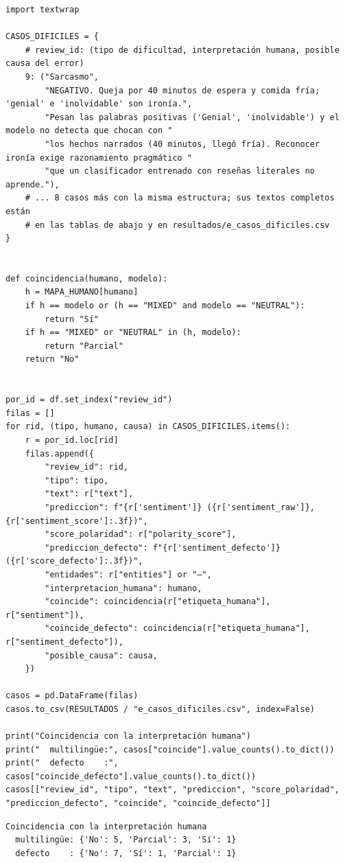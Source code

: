 \documentclass[12pt,a4paper]{article}
\begin{document}
\begin{lstlisting}[style=codigo]
import textwrap

CASOS_DIFICILES = {
    # review_id: (tipo de dificultad, interpretación humana, posible causa del error)
    9: ("Sarcasmo",
        "NEGATIVO. Queja por 40 minutos de espera y comida fría; 'genial' e 'inolvidable' son ironía.",
        "Pesan las palabras positivas ('Genial', 'inolvidable') y el modelo no detecta que chocan con "
        "los hechos narrados (40 minutos, llegó fría). Reconocer ironía exige razonamiento pragmático "
        "que un clasificador entrenado con reseñas literales no aprende."),
    # ... 8 casos más con la misma estructura; sus textos completos están
    # en las tablas de abajo y en resultados/e_casos_dificiles.csv
}


def coincidencia(humano, modelo):
    h = MAPA_HUMANO[humano]
    if h == modelo or (h == "MIXED" and modelo == "NEUTRAL"):
        return "Sí"
    if h == "MIXED" or "NEUTRAL" in (h, modelo):
        return "Parcial"
    return "No"


por_id = df.set_index("review_id")
filas = []
for rid, (tipo, humano, causa) in CASOS_DIFICILES.items():
    r = por_id.loc[rid]
    filas.append({
        "review_id": rid,
        "tipo": tipo,
        "text": r["text"],
        "prediccion": f"{r['sentiment']} ({r['sentiment_raw']}, {r['sentiment_score']:.3f})",
        "score_polaridad": r["polarity_score"],
        "prediccion_defecto": f"{r['sentiment_defecto']} ({r['score_defecto']:.3f})",
        "entidades": r["entities"] or "—",
        "interpretacion_humana": humano,
        "coincide": coincidencia(r["etiqueta_humana"], r["sentiment"]),
        "coincide_defecto": coincidencia(r["etiqueta_humana"], r["sentiment_defecto"]),
        "posible_causa": causa,
    })

casos = pd.DataFrame(filas)
casos.to_csv(RESULTADOS / "e_casos_dificiles.csv", index=False)

print("Coincidencia con la interpretación humana")
print("  multilingüe:", casos["coincide"].value_counts().to_dict())
print("  defecto    :", casos["coincide_defecto"].value_counts().to_dict())
casos[["review_id", "tipo", "text", "prediccion", "score_polaridad", "prediccion_defecto", "coincide", "coincide_defecto"]]
\end{lstlisting}

\begin{lstlisting}[style=salida]
Coincidencia con la interpretación humana
  multilingüe: {'No': 5, 'Parcial': 3, 'Sí': 1}
  defecto    : {'No': 7, 'Sí': 1, 'Parcial': 1}
\end{lstlisting}
\end{document}
